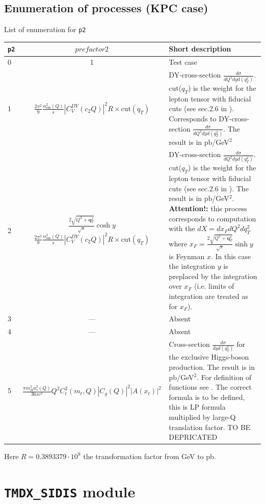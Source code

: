 \documentclass[prd,nofootinbib,eqsecnum,final]{revtex4}
\renewcommand{\(}{\left(}
\renewcommand{\)}{\right)}
\renewcommand{\[}{\left[}
\renewcommand{\]}{\right]}
\renewcommand{\vec}[1]{\bm{#1}}
\newcommand{\red}[1]{{\color[rgb]{1,0,0} #1}}
\begin{document}
\subsection{Enumeration of processes (KPC case)}

\begin{center}
List of enumeration for \texttt{p2}
\\
\begin{tabular}{||l|c||p{10cm}||}
\hline\hline
\texttt{p2} & ~~$prefactor2$~~&  Short description 
\\\hline
0 & 1 & Test case
\\\hline
1 & $\frac{2\pi^2}{9}\frac{\alpha_{\text{em}}^2(Q)}{s}|C_V^{DY}(c_2Q)|^2 R \times \text{cut}(q_T)$ & DY-cross-section $\frac{d\sigma}{dQ^2 dy d(q_T^2)}$. cut($q_T$) is the weight for the lepton tensor with fiducial cuts (see sec.2.6 in \cite{Scimemi:2017etj}). Corresponds to DY-cross-section $\frac{d\sigma}{dQ^2 dy d(q_T^2)}$.  The result is in pb/GeV$^2$
\\\hline
2 & $\frac{2\sqrt{Q^2+\vec q_T^2}}{\sqrt{s}}\cosh y$ $\frac{2\pi^2}{9}\frac{\alpha_{\text{em}}^2(Q)}{s}|C_V^{DY}(c_2Q)|^2 R \times \text{cut}(q_T)$ & DY-cross-section $\frac{d\sigma}{dQ^2 dy d(q_T^2)}$. cut($q_T$) is the weight for the lepton tensor with fiducial cuts (see sec.2.6 in \cite{Scimemi:2017etj}).  The result is in pb/GeV$^2$. \textbf{Attention!:} this process corresponds to computation with the $dX=dx_F dQ^2 dq_T^2$ where $x_F=\frac{2\sqrt{Q^2+\vec q_T^2}}{\sqrt{s}}\sinh y$ is Feynman $x$. In this case the integration $y$ is preplaced by the integration over $x_F$ (i.e. limits of integration are treated as for $x_F$).
\\\hline
3 & --- & Absent
\\\hline
4 & --- & Absent
\\\hline
5 & $\frac{\pi m_H^2 a_s^2(Q)}{36 s v^2}Q^2 C_t^2(m_t,Q)|C_g(Q)|^2|A(x_t)|^2$ & Cross-section $\frac{d\sigma}{dy d(q_T^2)}$ for the exclusive Higgs-boson production. The result is in pb/GeV$^2$. For definition of functions see \cite{Ahrens:2009cxz}. \red{The correct formula is to be defined, this is LP formula multiplied by large-Q translation factor.} \red{TO BE DEPRICATED}
\\\hline\hline
\end{tabular}
Here $R=0.3893379\cdot 10^9$ the transformation factor from GeV to pb.
\end{center}

\newpage
\section{\texttt{TMDX{\_}SIDIS} module}
\label{TMDXs}
\end{document}
